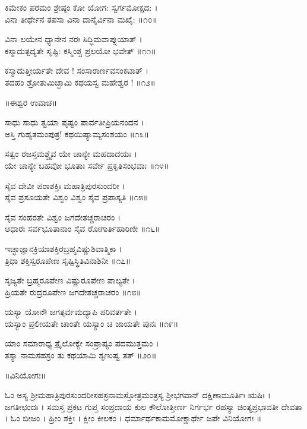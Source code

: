 ಕಿಮೇಕಂ ಪರಮಂ ಶ್ರೇಷ್ಠಂ ಕೋ ಯೋಗ: ಸ್ವರ್ಗಮೋಕ್ಷದ: ।\\
ವಿನಾ ತೀರ್ಥೇನ ತಪಸಾ ವಿನಾ ದಾನೈರ್ವಿನಾ ಮಖೈ: ॥೧೦॥

ವಿನಾ ಲಯೇನ ಧ್ಯಾನೇನ ನರಃ ಸಿದ್ಧಿಮವಾಪ್ನುಯಾತ್ ।\\
ಕಸ್ಮಾದುತ್ಪದ್ಯತೇ ಸೃಷ್ಟಿ: ಕಸ್ಮಿಂಶ್ಚ ಪ್ರಲಯೋ ಭವೇತ್ ॥೧೧॥

ಕಸ್ಮಾದುತ್ತೀರ್ಯತೇ ದೇವ ! ಸಂಸಾರಾರ್ಣವಸಂಕಟಾತ್ ।\\
ತದಹಂ ಶ್ರೋತುಮಿಚ್ಛಾಮಿ ಕಥಯಸ್ವ ಮಹೇಶ್ವರ ! ॥೧೨॥

॥ಈಶ್ವರ ಉವಾಚ॥

ಸಾಧು ಸಾಧು ತ್ವಯಾ ಪೃಷ್ಟಂ ಪಾರ್ವತೀಪ್ರಿಯನಂದನ ।\\
ಅಸ್ತಿ ಗುಹ್ಯತಮಂಪುತ್ರ! ಕಥಯಿಷ್ಯಾಮ್ಯಸಂಶಯಂ ॥೧೩॥

ಸತ್ವಂ ರಜಸ್ತಮಶ್ಚೈವ ಯೇ ಚಾನ್ಯೇ ಮಹದಾದಯಃ ।\\
ಯೇ ಚಾನ್ಯೇ ಬಹವೋ ಭೂತಾಃ ಸರ್ವೇ ಪ್ರಕೃತಿಸಂಭವಾಃ ॥೧೪॥

ಸೈವ ದೇವೀ ಪರಾಶಕ್ತಿಃ ಮಹಾತ್ರಿಪುರಸುಂದರೀ ।\\
ಸೈವ ಪ್ರಸೂಯತೇ ವಿಶ್ವಂ ವಿಶ್ವಂ ಸೈವ ಪ್ರಪಾಸ್ಯತಿ ॥೧೫॥

ಸೈವ ಸಂಹರತೇ ವಿಶ್ವಂ ಜಗದೇತಚ್ಚರಾಚರಂ ।\\
ಆಧಾರಃ ಸರ್ವಭೂತಾನಾಂ ಸೈವ ರೋಗಾರ್ತಿಹಾರಿಣೀ ॥೧೬॥

ಇಚ್ಛಾಜ್ಞಾನಕ್ರಿಯಾಶಕ್ತಿರಬ್ರಹ್ಮವಿಷ್ಣುಶಿವಾತ್ಮಿಕಾ ।\\
ತ್ರಿಧಾ ಶಕ್ತಿಸ್ವರೂಪೇಣ ಸೃಷ್ಟಿಸ್ಥಿತಿವಿನಾಶಿನೀ ॥೧೭॥

ಸೃಜ್ಯತೇ ಬ್ರಹ್ಮರೂಪೇಣ ವಿಷ್ಣುರೂಪೇಣ ಪಾಲ್ಯತೇ ।\\
ಹ್ರಿಯತೇ ರುದ್ರರೂಪೇಣ ಜಗದೇತಚ್ಚರಾಚರಂ ॥೧೮॥

ಯಸ್ಯಾ ಯೋನೌ ಜಗತ್ಸರ್ವಮದ್ಯಾಪಿ ಪರಿವರ್ತತೇ ।\\
ಯಸ್ಯಾಂ ಪ್ರಲೀಯತೇ ಚಾಂತೇ ಯಸ್ಯಾಂ ಚ ಜಾಯತೇ ಪುನಃ ॥೧೯॥

ಯಾಂ ಸಮಾರಾಧ್ಯ ತ್ರೈಲೋಕ್ಯೇ ಸಂಪ್ರಾಪ್ಯಂ ಪದಮುತ್ತಮಂ ।\\
ತಸ್ಯಾ ನಾಮಸಹಸ್ರಂ ತು ಕಥಯಾಮಿ ಶೃಣುಷ್ವ ತತ್ ॥೨೦॥

॥ವಿನಿಯೋಗಃ॥

ಓಂ ಅಸ್ಯ ಶ್ರೀಮಹಾತ್ರಿಪುರಸುಂದರೀಸಹಸ್ರನಾಮಸ್ತೋತ್ರಮಂತ್ರಸ್ಯ ಶ್ರೀಭಗವಾನ್ ದಕ್ಷಿಣಾಮೂರ್ತಿಃ ಋಷಿಃ । ಜಗತೀಛಂದಃ । ಸಮಸ್ತ ಪ್ರಕಟ ಗುಪ್ತ ಸಂಪ್ರದಾಯ ಕುಲ ಕೌಲೋತ್ತೀರ್ಣ ನಿರ್ಗರ್ಭ ರಹಸ್ಯಾ ಚಿಂತ್ಯಪ್ರಭಾವತೀ ದೇವತಾ । ಓಂ ಬೀಜಂ । ಹ್ರೀಂ ಶಕ್ತಿಃ । ಕ್ಲೀಂ ಕೀಲಕಂ । ಧರ್ಮಾರ್ಥಕಾಮಮೋಕ್ಷಾರ್ಥೇ ಜಪೇ ವಿನಿಯೋಗಃ  ॥


